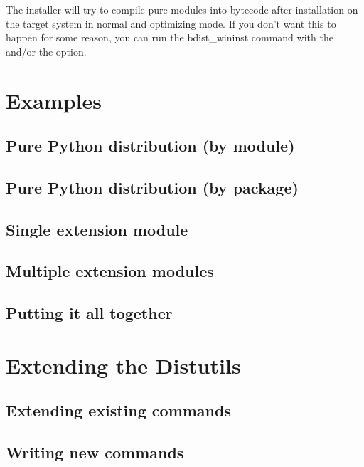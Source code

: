 \documentclass{howto}
\begin{document}
The installer will try to compile pure modules into bytecode after
installation on the target system in normal and optimizing mode.
If you don't want this to happen for some reason, you can run
the bdist_wininst command with the  and/or
the  option.

\section{Examples}
\label{examples}


\subsection{Pure Python distribution (by module)}
\label{pure-mod}


\subsection{Pure Python distribution (by package)}
\label{pure-pkg}


\subsection{Single extension module}
\label{single-ext}


\subsection{Multiple extension modules}
\label{multiple-ext}


\subsection{Putting it all together}



\section{Extending the Distutils}
\label{extending}


\subsection{Extending existing commands}
\label{extend-existing}


\subsection{Writing new commands}
\label{new-commands}
\end{document}
